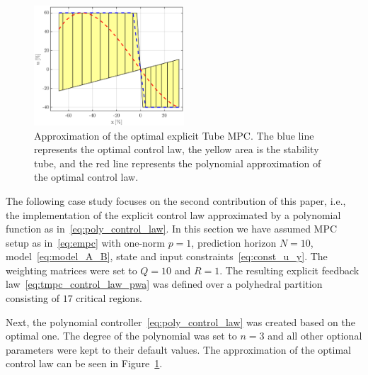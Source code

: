 \documentclass[letterpaper, 10 pt, conference]{ieeeconf}
\newcommand{\polydegree}{n}
\begin{document}
	\begin{figure}[bp!]
		\begin{center}
			\includegraphics[width=0.5\textwidth]{images/approximation.eps}
			\caption{Approximation of the optimal explicit Tube MPC. The blue line represents the optimal control law, the yellow area is the stability tube, and the red line represents the polynomial approximation of the optimal control law.}
			\label{fig:approx}
		\end{center}
	\end{figure}
	
	The following case study focuses on the second contribution of this paper, i.e., the implementation of the explicit control law approximated by a polynomial function as in~\eqref{eq:poly_control_law}. 
	In this section we have assumed MPC setup as in~\eqref{eq:empc} with one-norm $p = 1$, prediction horizon $N = 10$, model~\eqref{eq:model_A_B}, state and input constraints~\eqref{eq:const_u_y}. The weighting matrices were set to $Q = 10$ and $R = 1$.
	The resulting explicit feedback law~\eqref{eq:tmpc_control_law_pwa} was defined over a polyhedral partition consisting of $17$ critical regions.
	
	Next, the polynomial controller~\eqref{eq:poly_control_law} was created based on the optimal one. The degree of the polynomial was set to $\polydegree = 3$ and all other optional parameters were kept to their default values. The approximation of the optimal control law can be seen in Figure~\ref{fig:approx}.
	
	
	
	
	
\end{document}
